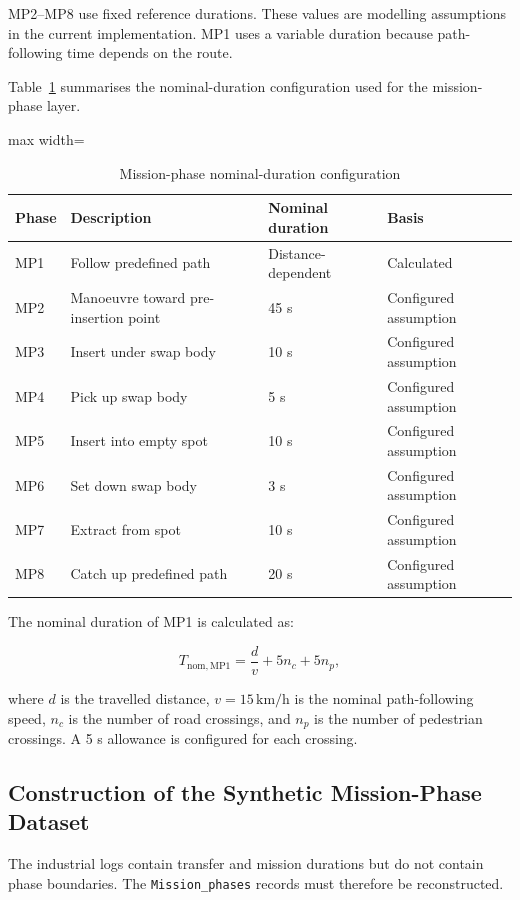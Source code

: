 MP2--MP8 use fixed reference durations. These values are modelling assumptions in the current implementation. MP1 uses a variable duration because path-following time depends on the route.

Table~\ref{tab:mission-phase-nominal-duration-configuration} summarises the nominal-duration configuration used for the mission-phase layer.

\begin{table}[htbp]
\small
\renewcommand{\arraystretch}{1.3}
\centering
\caption{Mission-phase nominal-duration configuration}
\label{tab:mission-phase-nominal-duration-configuration}
\begin{adjustbox}{max width=\textwidth}
\begin{tabular}{|p{1.2cm}|p{5.0cm}|p{2.5cm}|p{4.6cm}|}
\hline
\textbf{Phase} & \textbf{Description} & \textbf{Nominal duration} & \textbf{Basis} \\
\hline
MP1 & Follow predefined path & Distance-dependent & Calculated \\
\hline
MP2 & Manoeuvre toward pre-insertion point & 45 s & Configured assumption \\
\hline
MP3 & Insert under swap body & 10 s & Configured assumption \\
\hline
MP4 & Pick up swap body & 5 s & Configured assumption \\
\hline
MP5 & Insert into empty spot & 10 s & Configured assumption \\
\hline
MP6 & Set down swap body & 3 s & Configured assumption \\
\hline
MP7 & Extract from spot & 10 s & Configured assumption \\
\hline
MP8 & Catch up predefined path & 20 s & Configured assumption \\
\hline
\end{tabular}
\end{adjustbox}
\end{table}

The nominal duration of MP1 is calculated as:

$$
T_{\mathrm{nom},\mathrm{MP1}} = \frac{d}{v} + 5 n_c + 5 n_p,
$$

where $d$ is the travelled distance, $v = 15\,\mathrm{km/h}$ is the nominal path-following speed, $n_c$ is the number of road crossings, and $n_p$ is the number of pedestrian crossings. A 5 s allowance is configured for each crossing.

\subsection{Construction of the Synthetic Mission-Phase Dataset}
\label{subsec:construction-of-the-synthetic-mission-phase-dataset}
The industrial logs contain transfer and mission durations but do not contain phase boundaries. The \texttt{Mission\_phases} records must therefore be reconstructed.

